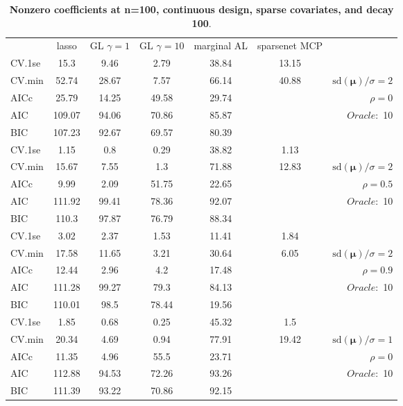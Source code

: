\begin{table}\vspace{-.5cm}
\caption[l]{ { \bf Nonzero coefficients at n=100, continuous design, 
sparse covariates, and  decay  100}.}
\vspace{-.5cm}
\footnotesize{}
\begin{center}
\begin{tabular}{l*{5}{c}|r}
& lasso & GL $\gamma=1$ & GL $\gamma=10$ & marginal AL & sparsenet MCP  & \\
 \cline{1-7}
CV.1se & 15.3 & 9.46 & 2.79 & 38.84 & 13.15 & \\
CV.min & 52.74 & 28.67 & 7.57 & 66.14 & 40.88 &  $\mathrm{sd}(\mathbf{\mu})/\sigma=2$ \\
AICc & 25.79 & 14.25 & 49.58 & 29.74 & & $\rho=0$ \\
AIC & 109.07 & 94.06 & 70.86 & 85.87 & &  \multirow{2}{*}{$Oracle: $ 10} \\
BIC & 107.23 & 92.67 & 69.57 & 80.39 & &  \\
 \hline 
CV.1se & 1.15 & 0.8 & 0.29 & 38.82 & 1.13 & \\
CV.min & 15.67 & 7.55 & 1.3 & 71.88 & 12.83 &  $\mathrm{sd}(\mathbf{\mu})/\sigma=2$ \\
AICc & 9.99 & 2.09 & 51.75 & 22.65 & & $\rho=0.5$ \\
AIC & 111.92 & 99.41 & 78.36 & 92.07 & &  \multirow{2}{*}{$Oracle: $ 10} \\
BIC & 110.3 & 97.87 & 76.79 & 88.34 & &  \\
 \hline 
CV.1se & 3.02 & 2.37 & 1.53 & 11.41 & 1.84 & \\
CV.min & 17.58 & 11.65 & 3.21 & 30.64 & 6.05 &  $\mathrm{sd}(\mathbf{\mu})/\sigma=2$ \\
AICc & 12.44 & 2.96 & 4.2 & 17.48 & & $\rho=0.9$ \\
AIC & 111.28 & 99.27 & 79.3 & 84.13 & &  \multirow{2}{*}{$Oracle: $ 10} \\
BIC & 110.01 & 98.5 & 78.44 & 19.56 & &  \\
 \hline 
CV.1se & 1.85 & 0.68 & 0.25 & 45.32 & 1.5 & \\
CV.min & 20.34 & 4.69 & 0.94 & 77.91 & 19.42 &  $\mathrm{sd}(\mathbf{\mu})/\sigma=1$ \\
AICc & 11.35 & 4.96 & 55.5 & 23.71 & & $\rho=0$ \\
AIC & 112.88 & 94.53 & 72.26 & 93.26 & &  \multirow{2}{*}{$Oracle: $ 10} \\
BIC & 111.39 & 93.22 & 70.86 & 92.15 & &  \\

\end{tabular}
\end{center}
\end{table}
